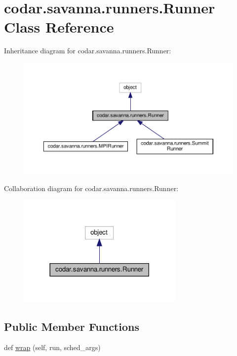 \hypertarget{classcodar_1_1savanna_1_1runners_1_1_runner}{}\section{codar.\+savanna.\+runners.\+Runner Class Reference}
\label{classcodar_1_1savanna_1_1runners_1_1_runner}


Inheritance diagram for codar.\+savanna.\+runners.\+Runner\+:
\nopagebreak
\begin{figure}[H]
\begin{center}
\leavevmode
\includegraphics[width=350pt]{classcodar_1_1savanna_1_1runners_1_1_runner__inherit__graph}
\end{center}
\end{figure}


Collaboration diagram for codar.\+savanna.\+runners.\+Runner\+:
\nopagebreak
\begin{figure}[H]
\begin{center}
\leavevmode
\includegraphics[width=230pt]{classcodar_1_1savanna_1_1runners_1_1_runner__coll__graph}
\end{center}
\end{figure}
\subsection*{Public Member Functions}
\begin{DoxyCompactItemize}
\item 
def \hyperlink{classcodar_1_1savanna_1_1runners_1_1_runner_a7e8a83cd991c604a5238af27bdc6e013}{wrap} (self, run, sched\+\_\+args)
\end{DoxyCompactItemize}


